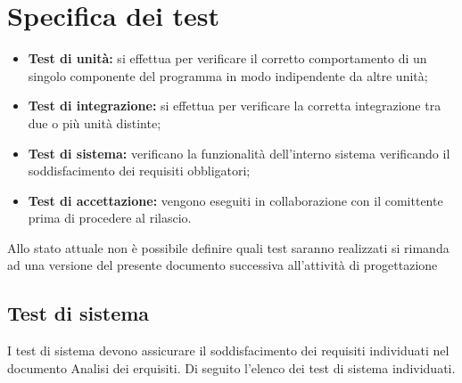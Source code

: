 \section{Specifica dei test}
\begin{itemize}
    \item \textbf{Test di unità:} si effettua per verificare il corretto comportamento di un singolo componente del programma in modo indipendente da altre unità;
    \item \textbf{Test di integrazione:} si effettua per verificare la corretta integrazione tra due o più unità distinte;
    \item \textbf{Test di sistema:} verificano la funzionalità dell'interno sistema verificando il soddisfacimento dei requisiti obbligatori;
    \item \textbf{Test di accettazione:} vengono eseguiti in collaborazione con il comittente prima di procedere al rilascio.
\end{itemize}

Allo stato attuale non è possibile definire quali test saranno realizzati si rimanda ad una versione del presente documento successiva all'attività di progettazione


\subsection{Test di sistema}

I test di sistema devono assicurare il soddisfacimento dei requisiti individuati nel documento Analisi dei erquisiti. 
Di seguito l'elenco dei test di sistema individuati.

